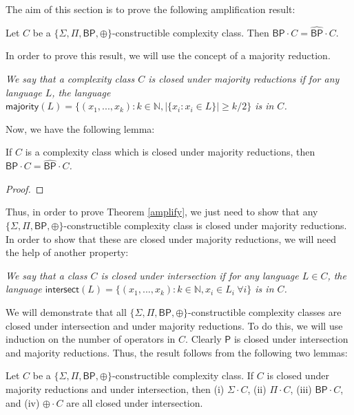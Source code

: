 \documentclass[11pt]{article}
\newcommand{\bp}{\textsf{BP}}
\newcommand{\strongbp}{\widehat{\textsf{BP}}}
\newcommand{\parity}{\oplus}
\newcommand{\p}{\textsf{P}}
\newcommand{\intersection}{\textsf{intersect}}
\newcommand{\majority}{\textsf{majority}}
\begin{document}
The aim of this section is to prove the following amplification result:

\begin{theorem}\label{amplify}
Let $C$ be a \emph{$\{\Sigma,\Pi,\bp,\parity\}$}-constructible complexity class. Then \emph{$\bp \cdot C = \strongbp \cdot C$}.
\end{theorem}
In order to prove this result, we will use the concept of a majority reduction.
\begin{definition}\label{defmajority}\emph{
We say that a complexity class $C$ is \emph{closed under majority reductions} if for any language $L$, the language $\majority(L) = \{(x_1,...,x_k) : k \in \mathbb{N}, |\{x_i : x_i \in L\}| \ge k/2\}$ is in $C$.
}\end{definition}
Now, we have the following lemma:
\begin{lemma}\label{majorityimpliesamplify}
If $C$ is a complexity class which is closed under majority reductions, then\linebreak \emph{$\bp \cdot C = \strongbp \cdot C$.}
\end{lemma}
\begin{proof} \end{proof}
Thus, in order to prove Theorem \ref{amplify}, we just need to show that any \emph{$\{\Sigma,\Pi,\bp,\parity\}$}-constructible complexity class is closed under majority reductions. In order to show that these are closed under majority reductions, we will need the help of another property:
\begin{definition}\label{defintersection}\emph{
We say that a class $C$ is \emph{closed under intersection} if for any language $L \in C$, the language $\intersection(L) = \{(x_1,...,x_k) : k\in\mathbb{N}, x_i \in L_i ~ \forall i\}$ is in $C$.
}\end{definition}
We will demonstrate that all $\{\Sigma, \Pi, \bp, \parity\}$-constructible complexity classes are closed under intersection and under majority reductions. To do this, we will use induction on the number of operators in $C$. Clearly $\p$ is closed under intersection and majority reductions. Thus, the result follows from the following two lemmas:

\begin{lemma}\label{intersectionlemma}
Let $C$ be a \emph{$\{\Sigma,\Pi,\bp,\parity\}$}-constructible complexity class. If $C$ is closed under majority reductions and under intersection, then (i) \emph{$\Sigma \cdot C$}, (ii) \emph{$\Pi \cdot C$}, (iii) \emph{$\bp \cdot C$}, and (iv) \emph{$\parity \cdot C$} are all closed under intersection.
\end{lemma}
\end{document}
